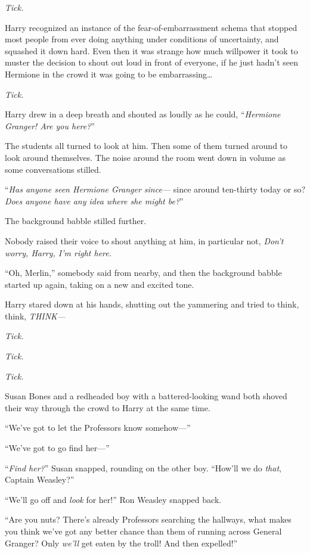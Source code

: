 \emph{Tick.}

Harry recognized an instance of the fear-of-embarrassment schema that stopped
most people from ever doing anything under conditions of uncertainty, and
squashed it down hard. Even then it was strange how much willpower it took to
muster the decision to shout out loud in front of everyone, if he just hadn’t
seen Hermione in the crowd it was going to be embarrassing…

\emph{Tick.}

Harry drew in a deep breath and shouted as loudly as he could, “\emph{Hermione
Granger! Are you here?}”

The students all turned to look at him. Then some of them turned around to look
around themselves. The noise around the room went down in volume as some
conversations stilled.

“\emph{Has anyone seen Hermione Granger since—} since around ten-thirty today
or so? \emph{Does anyone have any idea where she might be?}”

The background babble stilled further.

Nobody raised their voice to shout anything at him, in particular not,
\emph{Don’t worry, Harry, I’m right here.}

“Oh, Merlin,” somebody said from nearby, and then the background babble started
up again, taking on a new and excited tone.

Harry stared down at his hands, shutting out the yammering and tried to think,
think, \emph{THINK—}

\emph{Tick.}

\emph{Tick.}

\emph{Tick.}

Susan Bones and a redheaded boy with a battered-looking wand both shoved their
way through the crowd to Harry at the same time.

“We’ve got to let the Professors know somehow—”

“We’ve got to go find her—”

“\emph{Find her?}” Susan snapped, rounding on the other boy. “How’ll we do
\emph{that}, Captain Weasley?”

“We’ll go off and \emph{look} for her!” Ron Weasley snapped back.

“Are you nuts? There’s already Professors searching the hallways, what makes
you think we’ve got any better chance than them of running across General
Granger? Only \emph{we’ll} get eaten by the troll! And then expelled!”

